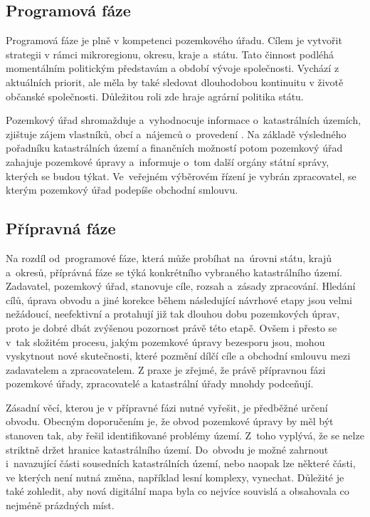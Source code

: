 \subsection{Programová fáze}
\label{programova_faze}

Programová fáze je plně v kompetenci pozemkového úřadu. Cílem je vytvořit strategii v rámci mikroregionu, okresu, kraje a~státu. Tato činnost podléhá momentálním politickým představám a období vývoje společnosti. Vychází z aktuálních priorit, ale měla by také sledovat dlouhodobou kontinuitu v životě občanské společnosti. Důležitou roli zde hraje agrární politika státu.

Pozemkový úřad shromažduje a~vyhodnocuje informace o~katastrálních územích, zjištuje zájem vlastníků, obcí a~nájemců o~provedení . Na základě výsledného pořadníku katastrálních území a finančních možností potom pozemkový úřad zahajuje pozemkové úpravy a~informuje o~tom další orgány státní správy, kterých se budou  týkat. Ve~veřejném výběrovém řízení je vybrán zpracovatel, se kterým pozemkový úřad podepíše obchodní smlouvu.

\subsection{Přípravná fáze}
\label{pripravna_faze}

Na rozdíl od~programové fáze, která může probíhat na~úrovni státu, krajů a~okresů, příprávná fáze se týká konkrétního vybraného katastrálního území. Zadavatel, pozemkový úřad, stanovuje cíle, rozsah a~zásady zpracování. Hledání cílů, úprava obvodu a jiné korekce během následující návrhové etapy jsou velmi nežádoucí, neefektivní a protahují již tak dlouhou dobu pozemkových úprav, proto je dobré dbát zvýšenou pozornost právě této etapě. Ovšem i přesto se v~tak složitém procesu, jakým pozemkové úpravy bezesporu jsou, mohou vyskytnout nové skutečnosti, které pozmění dílčí cíle a obchodní smlouvu mezi zadavatelem a zpracovatelem. Z praxe je zřejmé, že právě přípravnou fázi pozemkové úřady, zpracovatelé a katastrální úřady mnohdy podceňují.

Zásadní věcí, kterou je v přípravné fázi nutné vyřešit, je předběžné určení obvodu. Obecným doporučením je, že obvod pozemkové úpravy by měl být stanoven tak, aby řešil identifikované problémy území. Z~toho vyplývá, že se nelze striktně držet hranice katastrálního území. Do~obvodu je možné zahrnout i~navazující části sousedních katastrálních území, nebo naopak lze některé části, ve kterých není nutná změna, například lesní komplexy, vynechat. Důležité je také zohledit, aby nová digitální mapa byla co nejvíce souvislá a obsahovala co nejméně prázdných míst.